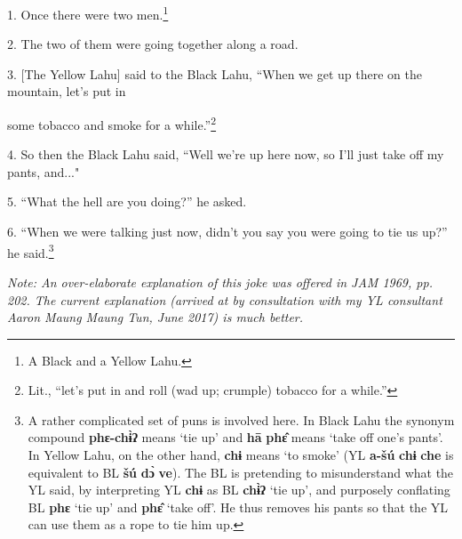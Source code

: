 \setcounter{footnote}{0}

1. Once there were two men.\footnote{A Black and a Yellow Lahu.}

2. The two of them were going together along a road.

3. [The Yellow Lahu] said to the Black Lahu, ``When we get up there on the
mountain, let's put in

some tobacco and smoke for a while.''\footnote{Lit., ``let's put in and roll (wad up; crumple) tobacco for a while.''}

4. So then the Black Lahu said, ``Well we're up here now, so I'll just take
off my pants, and..."

5. ``What the hell are you doing?'' he asked.

6. ``When we were talking just now, didn't you say you were going to tie
us up?'' he said.\footnote{A rather complicated set of puns is involved here. In Black Lahu the synonym compound \textbf{phɛ-chɨ̀ʔ} means `tie up' and \textbf{hā} \textbf{phɛ̂} means `take off one's pants'. In Yellow Lahu, on the other hand, \textbf{chɨ} means `to smoke' (YL \textbf{a-šú} \textbf{chɨ} \textbf{che} is equivalent to BL \textbf{šú} \textbf{dɔ̀} \textbf{ve}). The BL is pretending to misunderstand what the YL said, by interpreting YL \textbf{chɨ} as BL \textbf{chɨ̀ʔ} `tie up', and purposely conflating BL \textbf{phɛ} `tie up' and \textbf{phɛ̂} `take off'. He thus removes his pants so that the YL can use them as a rope to tie him up.}

\textit{Note: An over-elaborate explanation of this joke was offered in JAM 1969,
pp. 202. The current explanation (arrived at by consultation with my YL consultant
Aaron Maung Maung Tun, June 2017) is much better.}

